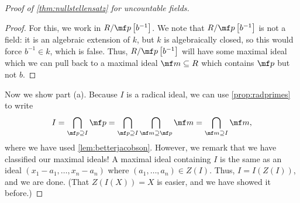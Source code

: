 \begin{proof}[Proof of \autoref{thm:nullstellensatz} for uncountable fields]
\begin{proof}
		For this, we work in $R/\mf p\left[b^{-1}\right]$. We note that $R/\mf p\left[b^{-1}\right]$ is not a field: %
		it is an algebraic extension of $k$, but $k$ is algebraically closed, so this would force $b^{-1}\in k$, which is false. Thus, $R/\mf p\left[b^{-1}\right]$ will have some maximal ideal which we can pull back to a maximal ideal $\mf m\subseteq R$ which contains $\mf p$ but not $b$.
	\end{proof}
	Now we show part (a). Because $I$ is a radical ideal, we can use \autoref{prop:radprimes} to write
	\[I=\bigcap_{\mf p\supseteq I}\mf p=\bigcap_{\mf p\supseteq I}\bigcap_{\mf m\supseteq\mf p}\mf m=\bigcap_{\mf m\supseteq I}\mf m,\]
	where we have used \autoref{lem:betterjacobson}. However, we remark that we have classified our maximal ideals! A maximal ideal containing $I$ is the same as an ideal $(x_1-a_1,\ldots,x_n-a_n)$ where $(a_1,\ldots,a_n)\in Z(I)$. Thus, $I=I(Z(I))$, and we are done. (That $Z(I(X))=X$ is easier, and we have showed it before.) %
\end{proof}

